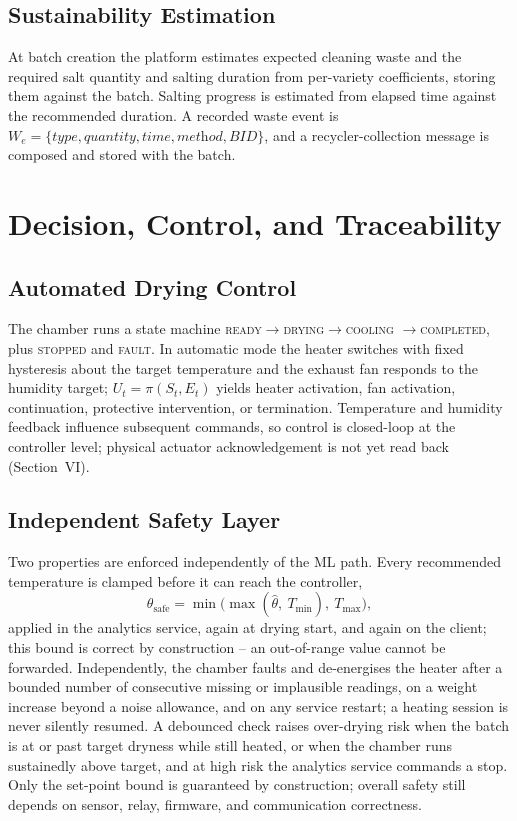 \documentclass[conference]{IEEEtran}
\begin{document}
\subsection{Sustainability Estimation}
At batch creation the platform estimates expected cleaning waste and the
required salt quantity and salting duration from per-variety coefficients,
storing them against the batch. Salting progress is estimated from elapsed
time against the recommended duration. A recorded waste event is
$W_{e}=\{\textit{type},\textit{quantity},\textit{time},\textit{method},BID\}$,
and a recycler-collection message is composed and stored with the batch.

\section{Decision, Control, and Traceability}

\subsection{Automated Drying Control}
The chamber runs a state machine
\textsc{ready}$\rightarrow$\textsc{drying}$\rightarrow$\textsc{cooling}%
$\rightarrow$\textsc{completed}, plus \textsc{stopped} and \textsc{fault}.
In automatic mode the heater switches with fixed hysteresis about the
target temperature and the exhaust fan responds to the humidity target;
$U_{t}=\pi(S_{t},E_{t})$ yields heater activation, fan activation,
continuation, protective intervention, or termination. Temperature and
humidity feedback influence subsequent commands, so control is closed-loop
at the controller level; physical actuator acknowledgement is not yet read
back (Section~VI).

\subsection{Independent Safety Layer}
Two properties are enforced independently of the ML path. Every recommended
temperature is clamped before it can reach the controller,
\begin{equation}
\theta_{\text{safe}} = \min\!\big(\max(\hat{\theta},\ T_{\min}),\
T_{\max}\big),\label{eq9}
\end{equation}
applied in the analytics service, again at drying start, and again on the
client; this bound is correct by construction -- an out-of-range value
cannot be forwarded. Independently, the chamber faults and de-energises the
heater after a bounded number of consecutive missing or implausible
readings, on a weight increase beyond a noise allowance, and on any service
restart; a heating session is never silently resumed. A debounced check
raises over-drying risk when the batch is at or past target dryness while
still heated, or when the chamber runs sustainedly above target, and at
high risk the analytics service commands a stop. Only the set-point bound
is guaranteed by construction; overall safety still depends on sensor,
relay, firmware, and communication correctness.
\end{document}
